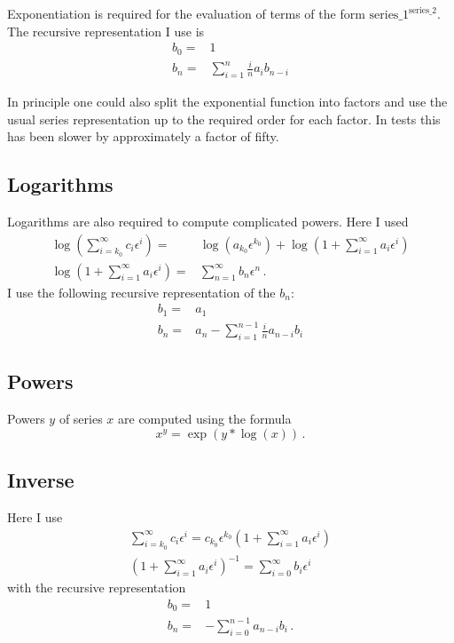 \documentclass[titlepage]{article}
\begin{document}
Exponentiation is required for the evaluation of terms of the form
$\text{series\_1}^{\text{series\_2}}$.
The recursive representation I use is
\begin{align}
  \label{eq:exp_rec}
b_0=&1\\
b_n =&  \sum_{i=1}^{n} \frac{i}{n} a_{i}b_{n-i}
\end{align}

In principle one could also split the exponential function into factors
and use the usual series representation up to the required order for
each factor. In tests this has been slower by approximately a factor of fifty.

\subsection{Logarithms}
\label{sec:impl_log}

Logarithms are also required to compute complicated powers. Here I used
\begin{align}
  \label{eq:log}
\log\left(\sum_{i=k_0}^{\infty}c_i \epsilon^i\right)=&\log\left(a_{k_0}\epsilon^{k_0}\right)+\log\left(1+\sum_{i=1}^{\infty}a_i \epsilon^i\right)\\
\log\left(1+\sum_{i=1}^{\infty}a_i \epsilon^i\right)=&\sum_{n=1}^\infty
b_n\epsilon^n\,.
\end{align}
I use the following recursive representation of the $b_n$:
\begin{align}
  \label{eq:log_rec}
b_1=&a_1\\
b_n =& a_n - \sum_{i=1}^{n-1} \frac{i}{n} a_{n-i}b_{i}
\end{align}

\subsection{Powers}
\label{sec:impl_pow}

Powers $y$ of series $x$ are computed using the formula
\begin{equation}
  \label{eq:pow}
  x^y=\exp(y*\log(x))\,.
\end{equation}


\subsection{Inverse}
\label{sec:impl_inverse}

Here I use
\begin{align}
  \label{eq:inv}
  \sum_{i=k_0}^{\infty}c_i
    \epsilon^i=c_{k_0}\epsilon^{k_0}\left(1+\sum_{i=1}^{\infty}a_i
    \epsilon^i\right)\\
\left(1+\sum_{i=1}^{\infty}a_i \epsilon^i\right)^{-1}=\sum_{i=0}^{\infty}b_i \epsilon^i
\end{align}
with the recursive representation
\begin{align}
  \label{eq:inv_rec}
  b_0=&1\\
  b_n=&-\sum_{i=0}^{n-1} a_{n-i}b_i \,.
\end{align}
\end{document}
